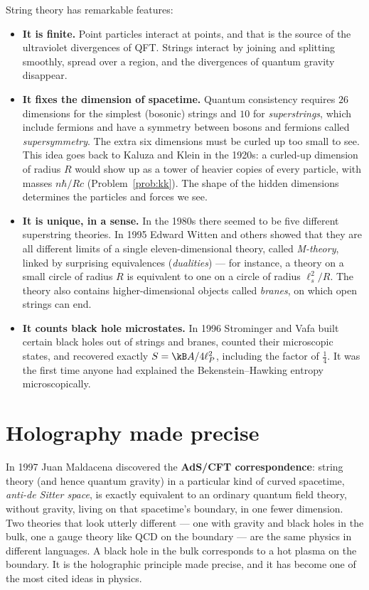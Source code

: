 String theory has remarkable features:
\begin{itemize}[itemsep=3pt]
  \item \textbf{It is finite.} Point particles interact at points, and that is the source of the ultraviolet divergences of QFT. Strings interact by joining and splitting smoothly, spread over a region, and the divergences of quantum gravity disappear.
  \item \textbf{It fixes the dimension of spacetime.} Quantum consistency requires $26$ dimensions for the simplest (bosonic) strings and $10$ for \emph{superstrings}, which include fermions and have a symmetry between bosons and fermions called \emph{supersymmetry}. The extra six dimensions must be curled up too small to see. This idea goes back to Kaluza and Klein in the 1920s: a curled-up dimension of radius $R$ would show up as a tower of heavier copies of every particle, with masses $n\hbar/Rc$ (Problem~\ref{prob:kk}). The shape of the hidden dimensions determines the particles and forces we see.
  \item \textbf{It is unique, in a sense.} In the 1980s there seemed to be five different superstring theories. In 1995 Edward Witten and others showed that they are all different limits of a single eleven-dimensional theory, called \emph{M-theory}, linked by surprising equivalences (\emph{dualities}) --- for instance, a theory on a small circle of radius $R$ is equivalent to one on a circle of radius $\ell_s^2/R$. The theory also contains higher-dimensional objects called \emph{branes}, on which open strings can end.
  \item \textbf{It counts black hole microstates.} In 1996 Strominger and Vafa built certain black holes out of strings and branes, counted their microscopic states, and recovered exactly $S = \kB A/4\ell_P^2$, including the factor of $\tfrac14$. It was the first time anyone had explained the Bekenstein--Hawking entropy microscopically.
\end{itemize}

\section{Holography made precise}

In 1997 Juan Maldacena discovered the \textbf{AdS/CFT correspondence}: string theory (and hence quantum gravity) in a particular kind of curved spacetime, \emph{anti-de Sitter space}, is exactly equivalent to an ordinary quantum field theory, without gravity, living on that spacetime's boundary, in one fewer dimension. Two theories that look utterly different --- one with gravity and black holes in the bulk, one a gauge theory like QCD on the boundary --- are the same physics in different languages. A black hole in the bulk corresponds to a hot plasma on the boundary. It is the holographic principle made precise, and it has become one of the most cited ideas in physics.

